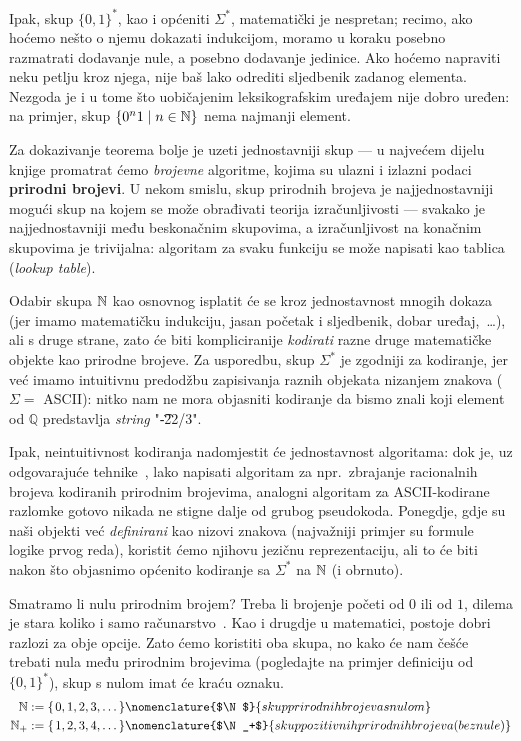 Ipak, skup $\{0,1\}^*$, kao i općeniti $\Sigma^*$, matematički je nespretan; recimo, ako hoćemo nešto o njemu dokazati indukcijom, moramo u koraku posebno razmatrati dodavanje nule, a posebno dodavanje jedinice. Ako hoćemo napraviti neku petlju kroz njega, nije baš lako odrediti sljedbenik zadanog elementa. Nezgoda je i u tome što uobičajenim leksikografskim uređajem nije dobro uređen: na primjer, skup $\{0^n1\mid n\in{\mathbb N}\}$ nema najmanji element.

Za dokazivanje teorema bolje je uzeti jednostavniji skup --- u najvećem dijelu knjige promatrat ćemo \emph{brojevne} algoritme, kojima su ulazni i izlazni podaci \textbf{prirodni brojevi}. U nekom smislu, skup prirodnih brojeva je najjednostavniji mogući skup na kojem se može obrađivati teorija izračunljivosti --- svakako je najjednostavniji među beskonačnim skupovima, a izračunljivost na konačnim skupovima je trivijalna: algoritam za svaku funkciju se može napisati kao tablica (\emph{lookup table}).

Odabir skupa ${\mathbb N}$ kao osnovnog isplatit će se kroz jednostavnost mnogih dokaza (jer imamo matematičku indukciju, jasan početak i sljedbenik, dobar uređaj,~\ldots), ali s druge strane, zato će biti kompliciranije \emph{kodirati} razne druge matematičke objekte kao prirodne brojeve. Za usporedbu, skup $\Sigma^*$ je zgodniji za kodiranje, jer već imamo intuitivnu predodžbu zapisivanja raznih objekata nizanjem znakova ($\Sigma=$ ASCII\@): nitko nam ne mora objasniti kodiranje da bismo znali koji element od $\mathbb Q$ predstavlja \emph{string} "\t{-22/3}".

Ipak, neintuitivnost kodiranja nadomjestit će jednostavnost algoritama: dok je, uz odgovarajuće tehnike~\cite{posav}, lako napisati algoritam za npr.\ zbrajanje racionalnih brojeva kodiranih prirodnim brojevima, analogni algoritam za ASCII-kodirane razlomke gotovo nikada ne stigne dalje od grubog pseudokoda. Ponegdje, gdje su naši objekti već \emph{definirani} kao nizovi znakova (najvažniji primjer su formule logike prvog reda), koristit ćemo njihovu jezičnu reprezentaciju, ali to će biti nakon što objasnimo općenito kodiranje sa $\Sigma^*$ na ${\mathbb N}$ (i obrnuto).

Smatramo li nulu prirodnim brojem? Treba li brojenje početi od $0$ ili od $1$, dilema je stara koliko i samo računarstvo~\cite{note:EWD831}. Kao i drugdje u matematici, postoje dobri razlozi za obje opcije. Zato ćemo koristiti oba skupa, no kako će nam češće trebati nula među prirodnim brojevima (pogledajte na primjer definiciju od $\{0,1\}^*$), skup s nulom imat će kraću oznaku.
\begin{align}
	\N&:=\{\mspace{2mu}0,1,2,3,\dotsc\}\nomenclature{$\N$}{skup prirodnih brojeva s nulom}\\
	\N_+&:=\{\mspace{2mu}1,2,3,4,\dotsc\}\nomenclature{$\N_+$}{skup pozitivnih prirodnih brojeva (bez nule)}
\end{align}

